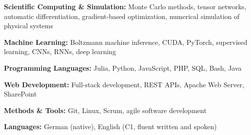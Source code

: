 \begin{skillslist}
    \item \textbf{Scientific Computing \& Simulation:} 
    Monte Carlo methods, tensor networks, automatic differentiation, gradient-based optimization, numerical simulation of physical systems
    \item \textbf{Machine Learning:} 
    Boltzmann machine inference, CUDA, PyTorch, supervised learning, CNNs, RNNs, deep learning
    \item \textbf{Programming Languages:} Julia, Python, JavaScript, PHP, SQL, Bash, Java
    \item \textbf{Web Development:} Full-stack development, REST APIs, Apache Web Server, SharePoint
    \item \textbf{Methods \& Tools:} Git, Linux, Scrum, agile software development
    \item \textbf{Languages:} German (native), English (C1, fluent written and spoken)
\end{skillslist}